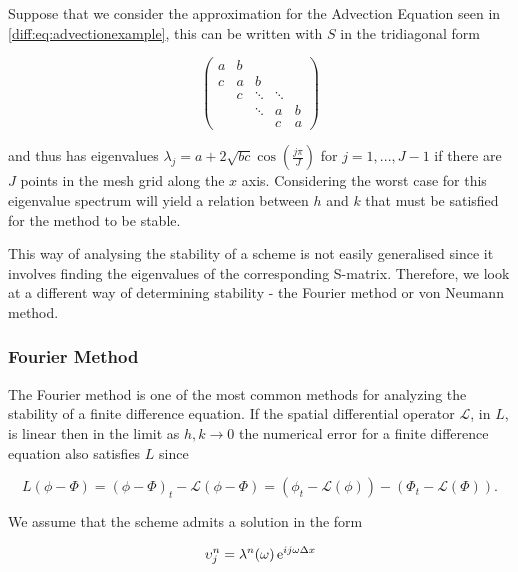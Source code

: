 \documentclass[../main.tex]{subfiles}
\begin{document}
  \begin{example}
    Suppose that we consider the approximation for the Advection Equation seen in \autoref{diff:eq:advectionexample}, this can be written with $S$ in the tridiagonal form

    \begin{equation}
      \begin{pmatrix}
        a & b & \\
        c & a & b \\
          & c & \ddots & \ddots & \\
          &   & \ddots & a & b \\
          &   &        & c & a
      \end{pmatrix}
    \end{equation}

    and thus has eigenvalues $\lambda_j = a + 2 \sqrt{bc} \cos{\left( \frac{j \pi}{J} \right)}$ for $j = 1, ... , J-1$ if there are $J$ points in the mesh grid along the $x$ axis. Considering the worst case for this eigenvalue spectrum will yield a relation between $h$ and $k$ that must be satisfied for the method to be stable.
  \end{example}

  This way of analysing the stability of a scheme is not easily generalised since it involves finding the eigenvalues of the corresponding S-matrix. Therefore, we look at a different way of determining stability - the Fourier method or von Neumann method.


  \subsubsection{Fourier Method}
  The Fourier method is one of the most common methods for analyzing the stability of a finite difference equation. If the spatial differential operator $\mathcal{L}$, in $L$, is linear then in the limit as $h, k \to 0$ the numerical error for a finite difference equation also satisfies $L$ since

  $$
    L(\phi - \Phi) = (\phi - \Phi)_t - \mathcal{L}(\phi - \Phi) = (\phi_t - \mathcal{L}(\phi)) - (\Phi_t - \mathcal{L}(\Phi)).
  $$

  We assume that the scheme admits a solution in the form

  \begin{equation}
    \upsilon^n_j = \lambda^n(\omega) \operatorname{e}^{i j \omega \Delta x}
  \end{equation}
\end{document}
